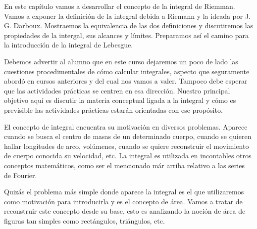 En este capítulo vamos a desarrollar el concepto de la integral de Riemman. Vamos a exponer la definición de la integral debida a Riemann y la ideada por J. G. Darboux.
Mostraemos la equivalencia de las dos definiciones y discutiremos las propiedades de la intergal, sus alcances y límites. Preparamos así el camino para la introducción de la integral de Lebesgue. 

Debemos advertir \advertencia  al alumno que en este curso dejaremos un poco de lado las cuestiones procedimentales de cómo calcular integrales, aspecto que seguramente abordó en cursos anteriores y del cual nos vamos a valer. Tampoco debe esperar que las actividades prácticas se centren en esa dirección.   Nuestro principal objetivo aquí es discutir la materia conceptual ligada a la integral y cómo es previsible las actividades prácticas estarán orientadas con ese propósito.


El concepto de integral encuentra su motivación en diversos problemas. Aparece cuando se busca el centro de masas de un determinado cuerpo, cuando se quieren hallar longitudes de arco, volúmenes, cuando se quiere reconstruir el movimiento de cuerpo conocida su velocidad, etc. La integral es utilizada en incontables otros conceptos matemáticos, como ser el mencionado már arriba relativo a las series de Fourier. 

Quizás el 
problema más simple donde aparece la integral es el que utilizaremos como motivación para introducirla y es el concepto de área.  Vamos a tratar de reconstruir este concepto desde su base, esto es analizando la noción de área de figuras tan simples como rectángulos, triángulos, etc. 



